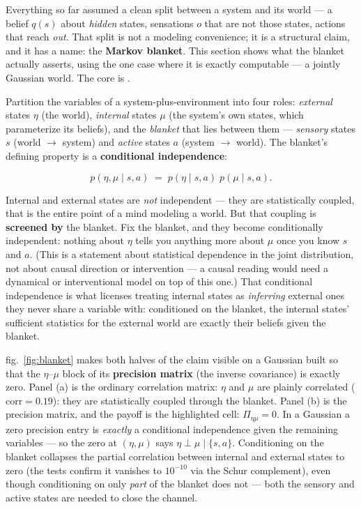 \documentclass[
  english,
]{article}
\begin{document}
Everything so far assumed a clean split between a system and its world
--- a belief \(q(s)\) about \emph{hidden} states, sensations \(o\) that
are not those states, actions that reach \emph{out}. That split is not a
modeling convenience; it is a structural claim, and it has a name: the
\textbf{Markov blanket}. This section shows what the blanket actually
asserts, using the one case where it is exactly computable --- a jointly
Gaussian world. The core is .

Partition the variables of a system-plus-environment into four roles:
\emph{external} states \(\eta\) (the world), \emph{internal} states
\(\mu\) (the system's own states, which parameterize its beliefs), and
the \emph{blanket} that lies between them --- \emph{sensory} states
\(s\) (world \(\to\) system) and \emph{active} states \(a\) (system
\(\to\) world). The blanket's defining property is a \textbf{conditional
independence}:

\[
p(\eta, \mu \mid s, a) \;=\; p(\eta \mid s, a)\; p(\mu \mid s, a).
\]

Internal and external states are \emph{not} independent --- they are
statistically coupled, that is the entire point of a mind modeling a
world. But that coupling is \textbf{screened by} the blanket. Fix the
blanket, and they become conditionally independent: nothing about
\(\eta\) tells you anything more about \(\mu\) once you know \(s\) and
\(a\). (This is a statement about statistical dependence in the joint
distribution, not about causal direction or intervention --- a causal
reading would need a dynamical or interventional model on top of this
one.) That conditional independence is what licenses treating internal
states as \emph{inferring} external ones they never share a variable
with: conditioned on the blanket, the internal states' sufficient
statistics for the external world are exactly their beliefs given the
blanket.

fig.~\ref{fig:blanket} makes both halves of the claim visible on a
Gaussian built so that the \(\eta\)--\(\mu\) block of its
\textbf{precision matrix} (the inverse covariance) is exactly zero.
Panel (a) is the ordinary correlation matrix: \(\eta\) and \(\mu\) are
plainly correlated (\(\mathrm{corr} = 0.19\)): they are statistically
coupled through the blanket. Panel (b) is the precision matrix, and the
payoff is the highlighted cell: \(\Pi_{\eta\mu} = 0\). In a Gaussian a
zero precision entry is \emph{exactly} a conditional independence given
the remaining variables --- so the zero at \((\eta,\mu)\) says
\(\eta \perp \mu \mid \{s,a\}\). Conditioning on the blanket collapses
the partial correlation between internal and external states to zero
(the tests confirm it vanishes to \(10^{-10}\) via the Schur
complement), even though conditioning on only \emph{part} of the blanket
does not --- both the sensory and active states are needed to close the
channel.
\end{document}
